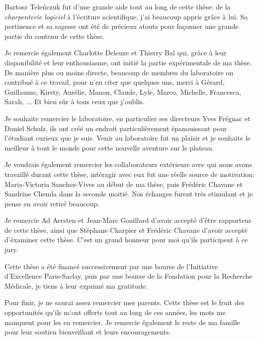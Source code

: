 \documentclass[11pt]{book}
\begin{document}
Bartosz Teleńczuk fut d'une grande aide tout au long de cette thèse:
de la \textit{charpenterie logiciel} à l'écriture scientifique, j'ai
beaucoup appris grâce à lui. Sa pertinence et sa sagesse ont été de
précieux atouts pour façonner une grande partie du contenu de cette
thèse.

Je remercie également Charlotte Deleuze et Thierry Bal qui, grâce à
leur disponibilité et leur enthousiasme, ont initié la partie
expérimentale de ma thèse. De manière plus ou moins directe, beaucoup
de membres du laboratoire on contribué à ce travail, pour n'en citer
que quelques uns, merci à Gérard, Guillaume, Kirsty, Aurélie, Manon,
Claude, Lyle, Marco, Michelle, Francesca, Sarah, ... Et bien sûr à
tous ceux que j'oublis.

Je souhaite remercier le laboratoire, en particulier ses directeurs
Yves Frégnac et Daniel Schulz, ils ont créé un endroit
particulièrement épanouissant pour l'étudiant curieux que je
suis. Venir au laboratoire fut un plaisir et je souhaite le meilleur à
tout le monde pour cette nouvelle aventure sur le plateau.

Je voudrais également remercier les collaborateurs extérieurs avec qui
nous avons travaillé durant cette thèse, intéragir avec eux fut une
réelle source de motivation: Maria-Victoria Sanchez-Vives au début de
ma thèse, puis Frédéric Chavane et Sandrine Chemla dans la seconde
moitié. Nos échanges furent très stimulant et je pense en avoir retiré
beaucoup.

Je remercie Ad Aersten et Jean-Marc Goaillard d'avoir accepté d'être
rapporteur de cette thèse, ainsi que Stéphane Charpier et Frédéric
Chavane d'avoir accepté d'éxaminer cette thèse. C'est un grand honneur
pour moi qu'ils participent à ce jury.

Cette thèse a été financé successivement par une bourse de
l'Initiative d'Excellence Paris-Saclay, puis par une bourse de la
Fondation pour la Recherche Médicale, je tiens à leur exprimé ma
gratitude.

Pour finir, je ne saurai assez remercier mes parents. Cette thèse est
le fruit des opportunités qu'ils m'ont offerts tout au long de ces
années, les mots me manquent pour les en remercier. Je remercie
également le reste de ma famille pour leur soutien bienveillant et
leurs encouragements.
\end{document}
